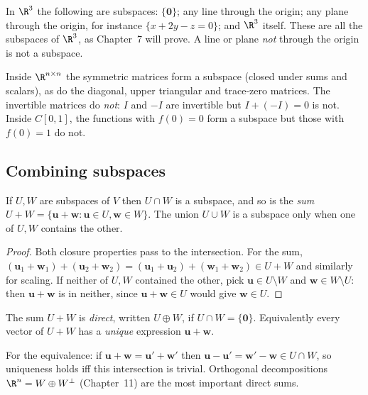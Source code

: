 \begin{example}
In $\R^3$ the following are subspaces: $\{\mathbf{0}\}$; any line through the origin; any plane through the origin, for instance $\{x+2y-z=0\}$; and $\R^3$ itself. These are all the subspaces of $\R^3$, as Chapter~7 will prove. A line or plane \emph{not} through the origin is not a subspace.
\end{example}

\begin{example}
Inside $\R^{n\times n}$ the symmetric matrices form a subspace (closed under sums and scalars), as do the diagonal, upper triangular and trace-zero matrices. The invertible matrices do \emph{not}: $I$ and $-I$ are invertible but $I+(-I)=0$ is not. Inside $C[0,1]$, the functions with $f(0)=0$ form a subspace but those with $f(0)=1$ do not.
\end{example}

\subsection*{Combining subspaces}

\begin{proposition}\label{prop:subops}
If $U,W$ are subspaces of $V$ then $U\cap W$ is a subspace, and so is the \emph{sum} $U+W=\{\mathbf{u}+\mathbf{w}:\mathbf{u}\in U,\mathbf{w}\in W\}$. The union $U\cup W$ is a subspace only when one of $U,W$ contains the other.
\end{proposition}

\begin{proof}
Both closure properties pass to the intersection. For the sum, $(\mathbf{u}_1+\mathbf{w}_1)+(\mathbf{u}_2+\mathbf{w}_2)=(\mathbf{u}_1+\mathbf{u}_2)+(\mathbf{w}_1+\mathbf{w}_2)\in U+W$ and similarly for scaling. If neither of $U,W$ contained the other, pick $\mathbf{u}\in U\setminus W$ and $\mathbf{w}\in W\setminus U$: then $\mathbf{u}+\mathbf{w}$ is in neither, since $\mathbf{u}+\mathbf{w}\in U$ would give $\mathbf{w}\in U$.
\end{proof}

\begin{definition}
The sum $U+W$ is \emph{direct}, written $U\oplus W$, if $U\cap W=\{\mathbf{0}\}$. Equivalently every vector of $U+W$ has a \emph{unique} expression $\mathbf{u}+\mathbf{w}$.
\end{definition}

For the equivalence: if $\mathbf{u}+\mathbf{w}=\mathbf{u}'+\mathbf{w}'$ then $\mathbf{u}-\mathbf{u}'=\mathbf{w}'-\mathbf{w}\in U\cap W$, so uniqueness holds iff this intersection is trivial. Orthogonal decompositions $\R^n=W\oplus W^\perp$ (Chapter~11) are the most important direct sums.

